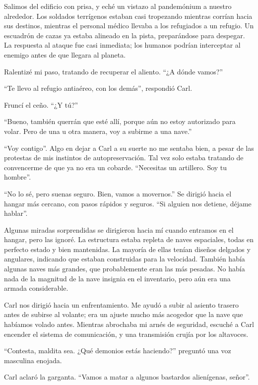 \documentclass[spanish,12pt,a4paper,oneside,titlepage]{book}
\begin{document}
    Salimos del edificio con prisa, y eché un vistazo al pandemónium a nuestro alrededor. Los soldados terrígenos estaban casi tropezando mientras corrían hacia sus destinos, mientras el personal médico llevaba a los refugiados a un refugio. Un escuadrón de cazas ya estaba alineado en la pista, preparándose para despegar. La respuesta al ataque fue casi inmediata; los humanos podrían interceptar al enemigo antes de que llegara al planeta.

    Ralentizé mi paso, tratando de recuperar el aliento. ``¿A dónde vamos?''

    ``Te llevo al refugio antiaéreo, con los demás'', respondió Carl.

    Fruncí el ceño. ``¿Y tú?''

    ``Bueno, también querrán que esté allí, porque aún no estoy autorizado para volar. Pero de una u otra manera, voy a subirme a una nave.''

    ``Voy contigo''. Algo en dejar a Carl a su suerte no me sentaba bien, a pesar de las protestas de mis instintos de autopreservación. Tal vez solo estaba tratando de convencerme de que ya no era un cobarde. ``Necesitas un artillero. Soy tu hombre''.

    ``No lo sé, pero suenas seguro. Bien, vamos a movernos.'' Se dirigió hacia el hangar más cercano, con pasos rápidos y seguros. ``Si alguien nos detiene, déjame hablar''.

    Algunas miradas sorprendidas se dirigieron hacia mí cuando entramos en el hangar, pero las ignoré. La estructura estaba repleta de naves espaciales, todas en perfecto estado y bien mantenidas. La mayoría de ellas tenían diseños delgados y angulares, indicando que estaban construidas para la velocidad. También había algunas naves más grandes, que probablemente eran las más pesadas. No había nada de la magnitud de la nave insignia en el inventario, pero aún era una armada considerable.

    Carl nos dirigió hacia un enfrentamiento. Me ayudó a subir al asiento trasero antes de subirse al volante; era un ajuste mucho más acogedor que la nave que habíamos volado antes. Mientras abrochaba mi arnés de seguridad, escuché a Carl encender el sistema de comunicación, y una transmisión crujía por los altavoces.

    ``Contesta, maldita sea. ¿Qué demonios estás haciendo?'' preguntó una voz masculina enojada.

    Carl aclaró la garganta. ``Vamos a matar a algunos bastardos alienígenas, señor''.
\end{document}
